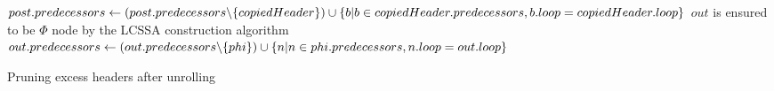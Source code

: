 \begin{algorithm}
    \begin{algorithmic}
                \State {}
            \EndFor
                \State $post.predecessors \gets (post.predecessors \backslash \{copiedHeader\}) \cup \newline \{b \vert  b \in copiedHeader.predecessors, b.loop = copiedHeader.loop\}$
            \EndFor
        \EndFunction
        \State{}
                \State \Comment $out$ is ensured to be $\Phi$ node by the LCSSA construction algorithm~\cite{aebi18bachelorarbeit}
                    \State $out.predecessors \gets (out.predecessors \backslash \{phi\}) \cup \newline \{n \vert  n \in phi.predecessors, n.loop = out.loop\}$
                \EndIf
            \EndFor
        \EndFunction
    \end{algorithmic}
    \caption{Pruning excess headers after unrolling}
    \label{alg:impl:unroll:prune-headers}
\end{algorithm}